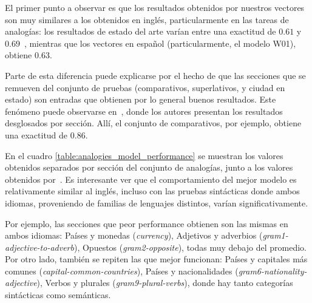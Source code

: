 El primer punto a observar es que los resultados obtenidos por nuestros vectores son muy similares a
los obtenidos en inglés, particularmente en las tareas de analogías: los resultados de estado del
arte varían entre una exactitud de $0.61$ y $0.69$~\cite{Levy2015, Baroni2014, Pennington2014,
Mikolov2013c}, mientras que los vectores en español (particularmente, el modelo W01), obtiene
$0.63$.

Parte de esta diferencia puede explicarse por el hecho de que las secciones que se remueven del
conjunto de pruebas (comparativos, superlativos, y ciudad en estado) son entradas que obtienen por
lo general buenos resultados. Este fenómeno puede observarse en~\cite{Levy2014b}, donde los autores
presentan los resultados desglosados por sección. Allí, el conjunto de comparativos, por ejemplo,
obtiene una exactitud de $0.86$.

En el cuadro \ref{table:analogies_model_performance} se muestran los valores obtenidos separados
por sección del conjunto de analogías, junto a los valores obtenidos por~\cite{Levy2014b}. Es
interesante ver que el comportamiento del mejor modelo es relativamente similar al inglés, incluso
con las pruebas sintácticas donde ambos idiomas, proveniendo de familias de lenguajes distintos,
varían significativamente.

Por ejemplo, las secciones que peor performance obtienen son las mismas en ambos idiomas: Países y
monedas (\textit{currency}), Adjetivos y adverbios (\textit{gram1-adjective-to-adverb}), Opuestos
(\textit{gram2-opposite}), todas muy debajo del promedio. Por otro lado, también se repiten las que
mejor funcionan: Países y capitales más comunes (\textit{capital-common-countries}), Países y
nacionalidades (\textit{gram6-nationality-adjective}), Verbos y plurales (\textit{gram9-plural-verbs}),
donde hay tanto categorías sintácticas como semánticas.

